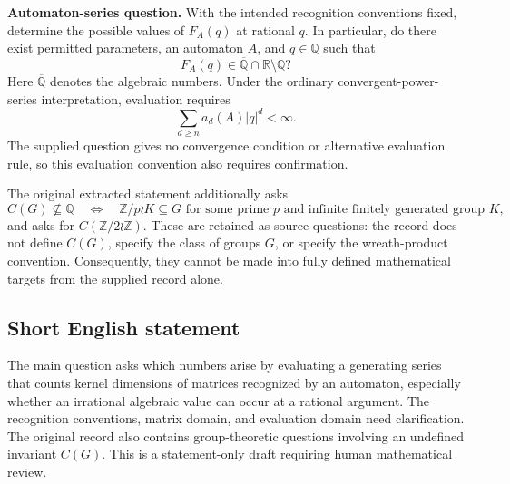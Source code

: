 \documentclass[11pt]{article}
\newcommand{\Z}{\mathbb{Z}}
\newcommand{\Q}{\mathbb{Q}}
\newcommand{\R}{\mathbb{R}}
\begin{document}
\textbf{Automaton-series question.} With the intended recognition conventions fixed, determine the possible values of \(F_A(q)\) at rational \(q\). In particular, do there exist permitted parameters, an automaton \(A\), and \(q\in\Q\) such that
\[
F_A(q)\in\overline{\Q}\cap\R\setminus\Q?
\]
Here \(\overline{\Q}\) denotes the algebraic numbers. Under the ordinary convergent-power-series interpretation, evaluation requires
\[
\sum_{d\geq n}a_d(A)|q|^d<\infty.
\]
The supplied question gives no convergence condition or alternative evaluation rule, so this evaluation convention also requires confirmation.

The original extracted statement additionally asks
\[
C(G)\not\subseteq\Q
\quad\Longleftrightarrow\quad
\Z/p\wr K\subseteq G
\text{ for some prime }p\text{ and infinite finitely generated group }K,
\]
and asks for \(C(\Z/2\wr\Z)\). These are retained as source questions: the record does not define \(C(G)\), specify the class of groups \(G\), or specify the wreath-product convention. Consequently, they cannot be made into fully defined mathematical targets from the supplied record alone.
\subsection{Short English statement}
The main question asks which numbers arise by evaluating a generating series that counts kernel dimensions of matrices recognized by an automaton, especially whether an irrational algebraic value can occur at a rational argument. The recognition conventions, matrix domain, and evaluation domain need clarification. The original record also contains group-theoretic questions involving an undefined invariant \(C(G)\). This is a statement-only draft requiring human mathematical review.
\end{document}
